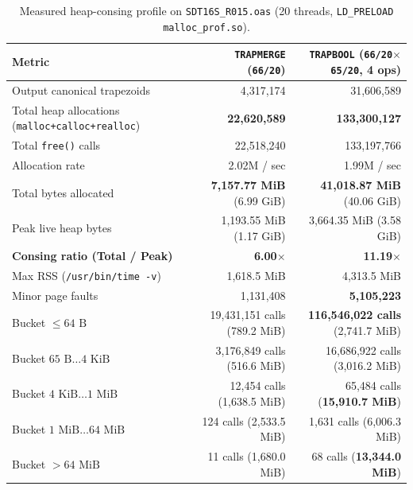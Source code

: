 \begin{table}[htbp]
\centering
\caption{Measured heap-consing profile on \texttt{SDT16S\_R015.oas} (20 threads, \texttt{LD\_PRELOAD} \texttt{malloc\_prof.so}).}
\label{tab:consing_profile}
\small
\begin{tabular}{@{}lrr@{}}
\toprule
\textbf{Metric} & \textbf{\texttt{TRAPMERGE} (\texttt{66/20})} & \textbf{\texttt{TRAPBOOL} (\texttt{66/20}$\times$\texttt{65/20}, 4 ops)} \\
\midrule
Output canonical trapezoids & 4,317,174 & 31,606,589 \\
Total heap allocations (\texttt{malloc+calloc+realloc}) & \textbf{22,620,589} & \textbf{133,300,127} \\
Total \texttt{free()} calls & 22,518,240 & 133,197,766 \\
Allocation rate & 2.02M / sec & 1.99M / sec \\
Total bytes allocated & \textbf{7,157.77 MiB} (6.99 GiB) & \textbf{41,018.87 MiB} (40.06 GiB) \\
Peak live heap bytes & 1,193.55 MiB (1.17 GiB) & 3,664.35 MiB (3.58 GiB) \\
\textbf{Consing ratio (Total / Peak)} & \textbf{6.00$\times$} & \textbf{11.19$\times$} \\
Max RSS (\texttt{/usr/bin/time -v}) & 1,618.5 MiB & 4,313.5 MiB \\
Minor page faults & 1,131,408 & \textbf{5,105,223} \\
\midrule
Bucket $\le 64\text{ B}$ & 19,431,151 calls (789.2 MiB) & \textbf{116,546,022 calls} (2,741.7 MiB) \\
Bucket $65\text{ B}\dots 4\text{ KiB}$ & 3,176,849 calls (516.6 MiB) & 16,686,922 calls (3,016.2 MiB) \\
Bucket $4\text{ KiB}\dots 1\text{ MiB}$ & 12,454 calls (1,638.5 MiB) & 65,484 calls (\textbf{15,910.7 MiB}) \\
Bucket $1\text{ MiB}\dots 64\text{ MiB}$ & 124 calls (2,533.5 MiB) & 1,631 calls (6,006.3 MiB) \\
Bucket $> 64\text{ MiB}$ & 11 calls (1,680.0 MiB) & 68 calls (\textbf{13,344.0 MiB}) \\
\bottomrule
\end{tabular}
\end{table}


